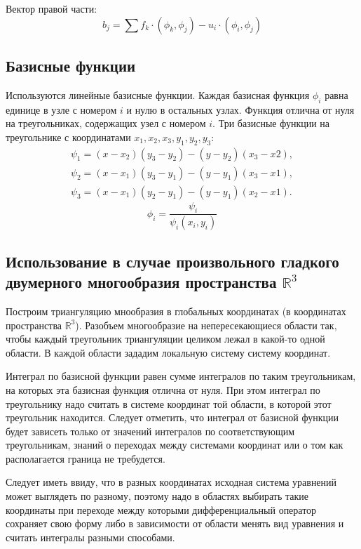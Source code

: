 \documentclass[a4paper]{article}
\begin{document}
Вектор правой части:
\begin{equation*}
b_j= \sum f_k \cdot (\phi_k, \phi_j) - u_i\cdot (\phi_i, \phi_j)
\end{equation*}

\subsection*{Базисные  функции}
Используются линейные базисные функции. Каждая базисная функция
$\phi_i$ равна единице в узле с номером $i$ и нулю в остальных
узлах. Функция отлична от нуля на треугольниках, содержащих узел с
номером $i$. 
Три базисные функции на треугольнике с координатами $x_1,x_2,x_3, y_1,y_2,y_3$:
\begin{equation}\label{basis}
\begin{split}
\psi_1=(x-x_2)(y_3-y_2)-(y-y_2)(x_3-x2),\\
\psi_2=(x-x_1)(y_3-y_1)-(y-y_1)(x_3-x1),\\
\psi_3=(x-x_1)(y_2-y_1)-(y-y_1)(x_2-x1).
\end{split}
\end{equation}
\begin{equation*}
\phi_i=\frac{\psi_i}{\psi_i(x_i,y_i)}
\end{equation*}

\subsection*{Использование в случае произвольного гладкого
 двумерного многообразия пространства ${\mathbb R}^{3}$}

Построим триангуляцию мнообразия в глобальных координатах (в
координатах пространства ${\mathbb R}^{3}$). Разобъем многообразие на
непересекающиеся области так, чтобы каждый треугольник триангуляции
целиком лежал в какой-то одной области. В каждой области зададим
локальную систему систему координат. 

Интеграл по базисной функции равен сумме интегралов по таким
треугольникам, на которых эта базисная функция отлична от нуля. При
этом интеграл по треугольнику надо считать в системе координат той
области, в которой этот треугольник находится. Следует отметить, что
интеграл от базисной функции будет зависеть только от значений
интегралов по соответствующим треугольникам, знаний о переходах между
системами координат или о том как располагается граница не
требудется. 

Следует иметь ввиду, что в разных координатах исходная система
уравнений может выглядеть по разному, поэтому надо в областях
выбирать такие координаты при переходе между которыми дифференциальный
оператор сохраняет свою форму либо в зависимости от области менять вид
уравнения и считать интегралы разными способами.
\end{document}
